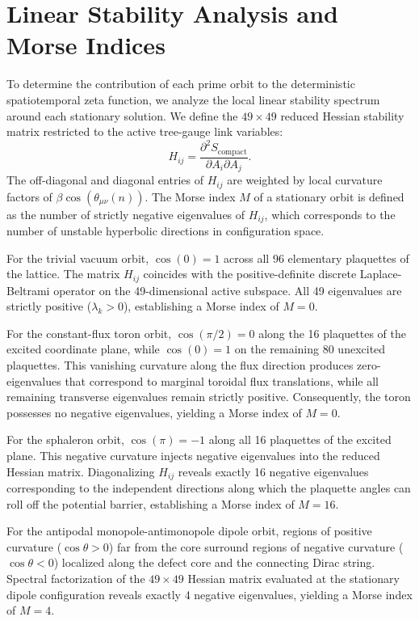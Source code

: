 \documentclass[11pt,a4paper]{article}
\begin{document}
\section{Linear Stability Analysis and Morse Indices}

To determine the contribution of each prime orbit to the deterministic spatiotemporal zeta function, we analyze the local linear stability spectrum around each stationary solution. We define the $49 \times 49$ reduced Hessian stability matrix restricted to the active tree-gauge link variables:
\begin{equation}
H_{ij} = \frac{\partial^2 S_{\text{compact}}}{\partial A_i \partial A_j}.
\end{equation}
The off-diagonal and diagonal entries of $H_{ij}$ are weighted by local curvature factors of $\beta \cos(\theta_{\mu\nu}(n))$. The Morse index $M$ of a stationary orbit is defined as the number of strictly negative eigenvalues of $H_{ij}$, which corresponds to the number of unstable hyperbolic directions in configuration space.

For the trivial vacuum orbit, $\cos(0) = 1$ across all 96 elementary plaquettes of the lattice. The matrix $H_{ij}$ coincides with the positive-definite discrete Laplace-Beltrami operator on the 49-dimensional active subspace. All 49 eigenvalues are strictly positive ($\lambda_k > 0$), establishing a Morse index of $M = 0$.

For the constant-flux toron orbit, $\cos(\pi/2) = 0$ along the 16 plaquettes of the excited coordinate plane, while $\cos(0) = 1$ on the remaining 80 unexcited plaquettes. This vanishing curvature along the flux direction produces zero-eigenvalues that correspond to marginal toroidal flux translations, while all remaining transverse eigenvalues remain strictly positive. Consequently, the toron possesses no negative eigenvalues, yielding a Morse index of $M = 0$.

For the sphaleron orbit, $\cos(\pi) = -1$ along all 16 plaquettes of the excited plane. This negative curvature injects negative eigenvalues into the reduced Hessian matrix. Diagonalizing $H_{ij}$ reveals exactly 16 negative eigenvalues corresponding to the independent directions along which the plaquette angles can roll off the potential barrier, establishing a Morse index of $M = 16$.

For the antipodal monopole-antimonopole dipole orbit, regions of positive curvature ($\cos \theta > 0$) far from the core surround regions of negative curvature ($\cos \theta < 0$) localized along the defect core and the connecting Dirac string. Spectral factorization of the $49 \times 49$ Hessian matrix evaluated at the stationary dipole configuration reveals exactly 4 negative eigenvalues, yielding a Morse index of $M = 4$.
\end{document}
